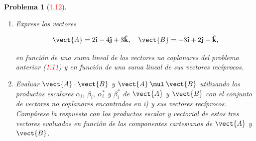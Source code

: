 \documentclass[12pt]{article}
\theoremstyle{break}
\newtheorem{exercise}{Problema}
\theoremstyle{nonumberbreak}
\newcommand*{\uveci}{{\bm{\hat{\textnormal{\bfseries\i}}}}}
\newcommand*{\uvecj}{{\bm{\hat{\textnormal{\bfseries\j}}}}}
\DeclareRobustCommand{\uvec}[1]{{%
  \ifcsname uvec#1\endcsname
     \csname uvec#1\endcsname
   \else
    \bm{\hat{\mathbf{#1}}}%
   \fi
}}%
\newcommand*{\uvectk}{\uvec{k}}
\newcommand*{\dotprod}[2]{#1 \mathbin{\cdot} #2\xspace}
\newcommand*{\crossprod}[2]{#1 \mathbin{\mul} #2\xspace}
\begin{document}
    \begin{exercise}[\textcolor{red}{1.12}]
      \begin{enumerate}[label = \roman*)]
        \item Exprese los vectores
        
        \begin{equation*}
          \vect{A} = 2\uveci - 4\uvecj + 3\uvectk,\quad \vect{B} = -3\uveci + 2\uvecj - \uvectk,
        \end{equation*}

        en función de una suma lineal de los vectores no coplanares del problema anterior (\textcolor{red}{1.11}) y en función de una suma lineal de sus vectores recíprocos.

        \item Evaluar \(\dotprod{\vect{A}}{\vect{B}}\) y \(\crossprod{\vect{A}}{\vect{B}}\) utilizando los productos escalares \(\alpha_{i},\ \beta_{i},\ \alpha_{i}^{*}\) y \(\beta_{i}^{*}\) de \(\vect{A}\) y \(\vect{B}\) con el conjunto de vectores no coplanares encontrados en i) y sus vectores recíprocos. Compárese la respuesta con los productos escalar y vectorial de estos tres vectores evaluados en función de las componentes cartesianas de \(\vect{A}\) y \(\vect{B}\).
        
      \end{enumerate}
    \end{exercise}
    
\end{document}
